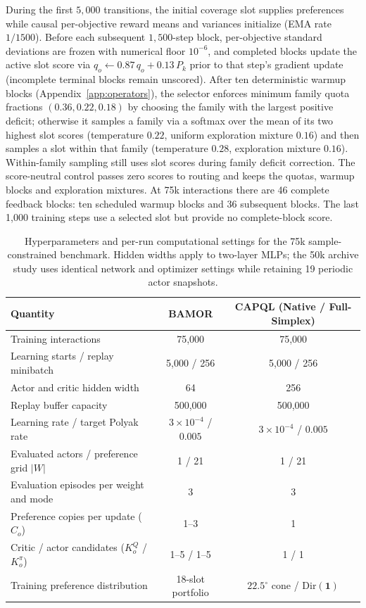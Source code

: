 During the first $5{,}000$ transitions, the initial coverage slot supplies
preferences while causal per-objective reward means and variances initialize
(EMA rate $1/1500$). Before each subsequent $1{,}500$-step block, per-objective
standard deviations are frozen with numerical floor $10^{-6}$, and completed
blocks update the active slot score via $q_o \leftarrow 0.87\,q_o + 0.13\,P_k$
prior to that step's gradient update (incomplete terminal blocks remain
unscored). After ten deterministic warmup blocks
(Appendix~\ref{app:operators}), the selector enforces minimum family quota
fractions $(0.36, 0.22, 0.18)$ by choosing the family with the largest positive
deficit; otherwise it samples a family via a softmax over the mean of its two
highest slot scores (temperature $0.22$, uniform exploration mixture $0.16$)
and then samples a slot within that family (temperature $0.28$, exploration
mixture $0.16$). Within-family sampling still uses slot scores during family
deficit correction. The score-neutral control passes zero scores to routing
and keeps the quotas, warmup blocks and exploration mixtures.
At 75k interactions there are 46 complete feedback blocks: ten scheduled
warmup blocks and 36 subsequent blocks. The last 1,000 training steps use
a selected slot but provide no complete-block score.

\begin{table}[htbp]
\centering\small
\caption{Hyperparameters and per-run computational settings for the 75k
sample-constrained benchmark. Hidden widths apply to two-layer MLPs; the 50k
archive study uses identical network and optimizer settings while retaining 19
periodic actor snapshots.}
\label{tab:v23_budget}
\begin{tabular}{lcc}
\toprule
Quantity & BAMOR & CAPQL (Native / Full-Simplex)\\
\midrule
Training interactions & 75,000 & 75,000\\
Learning starts / replay minibatch & 5,000 / 256 & 5,000 / 256\\
Actor and critic hidden width & 64 & 256\\
Replay buffer capacity & 500,000 & 500,000\\
Learning rate / target Polyak rate & $3\times 10^{-4}$ / $0.005$ & $3\times 10^{-4}$ / $0.005$\\
Evaluated actors / preference grid $|W|$ & 1 / 21 & 1 / 21\\
Evaluation episodes per weight and mode & 3 & 3\\
Preference copies per update ($C_o$) & 1--3 & 1\\
Critic / actor candidates ($K_o^Q$ / $K_o^\pi$) & 1--5 / 1--5 & 1 / 1\\
Training preference distribution & 18-slot portfolio & $22.5^\circ$ cone / $\mathrm{Dir}(\mathbf{1})$\\
\bottomrule
\end{tabular}
\end{table}
